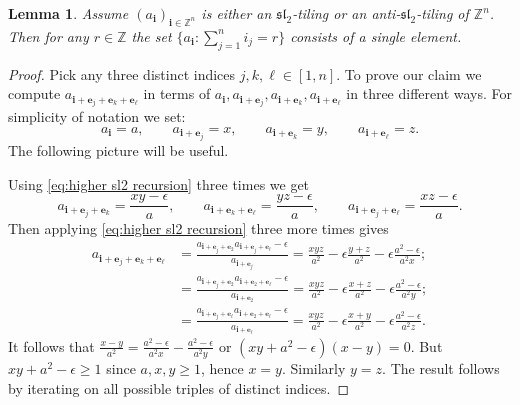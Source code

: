 \documentclass{amsart}
\newtheorem{lemma}[theorem]{Lemma}
\newcommand{\be}{\boldsymbol{e}}
\newcommand{\bi}{\boldsymbol{i}}
\newcommand{\fsl}{\mathfrak{sl}}
\newcommand{\ZZ}{\mathbb{Z}}
\begin{document}
  \begin{lemma}\label{le:constant slices}
    Assume $(a_{\bi})_{\bi\in\ZZ^n}$ is either an $\fsl_2$-tiling or an anti-$\fsl_2$-tiling of $\ZZ^n$.
    Then for any $r\in\ZZ$ the set $\{a_{\bi}: \sum_{j=1}^n i_j=r\}$ consists of a single element.
  \end{lemma}
  \begin{proof}
    Pick any three distinct indices $j,k,\ell\in[1,n]$.
    To prove our claim we compute $a_{\bi+\be_j+\be_k+\be_\ell}$ in terms of $a_{\bi}, a_{\bi+\be_j}, a_{\bi+\be_k}, a_{\bi+\be_\ell}$ in three different ways.
    For simplicity of notation we set:
    \[
      a_{\bi}=a,
      \quad\quad 
      a_{\bi+\be_j}=x,
      \quad\quad 
      a_{\bi+\be_k}=y,
      \quad\quad 
      a_{\bi+\be_\ell}=z.
    \]
    The following picture will be useful.
    \begin{center}
    \end{center}
    Using \eqref{eq:higher sl2 recursion} three times we get
    \[
      a_{\bi+\be_j+\be_k}=\frac{xy-\epsilon}{a},
      \quad\quad 
      a_{\bi+\be_k+\be_\ell}=\frac{yz-\epsilon}{a},
      \quad\quad 
      a_{\bi+\be_j+\be_\ell}=\frac{xz-\epsilon}{a}.
    \]
    Then applying \eqref{eq:higher sl2 recursion} three more times gives
    \begin{align*}
      a_{\bi+\be_j+\be_k+\be_\ell}
      &= \frac{a_{\bi+\be_j+\be_2}a_{\bi+\be_j+\be_\ell}-\epsilon}{a_{\bi+\be_j}}=\frac{xyz}{a^2}-\epsilon\frac{y+z}{a^2}-\epsilon\frac{a^2-\epsilon}{a^2x};\\
      &= \frac{a_{\bi+\be_j+\be_2}a_{\bi+\be_2+\be_\ell}-\epsilon}{a_{\bi+\be_2}}=\frac{xyz}{a^2}-\epsilon\frac{x+z}{a^2}-\epsilon\frac{a^2-\epsilon}{a^2y};\\
      &= \frac{a_{\bi+\be_j+\be_\ell}a_{\bi+\be_2+\be_\ell}-\epsilon}{a_{\bi+\be_\ell}}=\frac{xyz}{a^2}-\epsilon\frac{x+y}{a^2}-\epsilon\frac{a^2-\epsilon}{a^2z}.
    \end{align*}
    It follows that $\frac{x-y}{a^2}=\frac{a^2-\epsilon}{a^2x}-\frac{a^2-\epsilon}{a^2y}$ or $(xy+a^2-\epsilon)(x-y)=0$.  
    But $xy+a^2-\epsilon\ge1$ since $a,x,y\ge1$, hence $x=y$.  
    Similarly $y=z$.
    The result follows by iterating on all possible triples of distinct indices.
  \end{proof}
\end{document}
